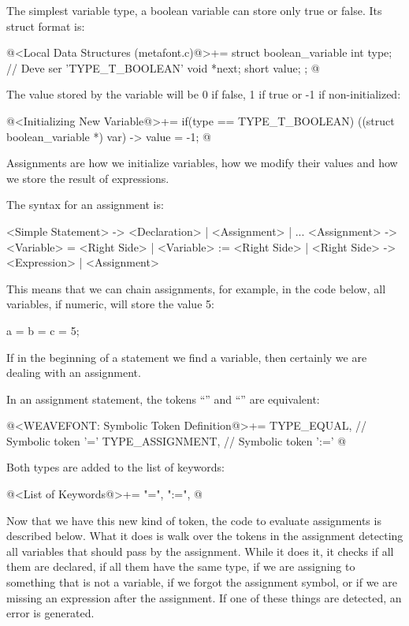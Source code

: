 
The simplest variable type, a boolean variable can store only true or
false. Its struct format is:

\iniciocodigo
@<Local Data Structures (metafont.c)@>+=
struct boolean_variable{
  int type; // Deve ser 'TYPE_T_BOOLEAN'
  void *next;
  short value;
};
@
\fimcodigo

The value stored by the variable will be 0 if false, 1 if true or -1
if non-initialized:

\iniciocodigo
@<Initializing New Variable@>+=
if(type == TYPE_T_BOOLEAN)
  ((struct boolean_variable *) var) -> value = -1;
@
\fimcodigo



Assignments are how we initialize variables, how we modify their
values and how we store the result of expressions.

The syntax for an assignment is:

\alinhaverbatim
<Simple Statement> -> <Declaration> | <Assignment> | ...
<Assignment> -> <Variable> = <Right Side> |
                <Variable> := <Right Side> |
<Right Side> -> <Expression> | <Assignment>
\alinhanormal

This means that we can chain assignments, for example, in the code
below, all variables, if numeric, will store the value 5:

\alinhaverbatim
a = b = c = 5;
\alinhanormal

If in the beginning of a statement we find a variable, then certainly
we are dealing with an assignment.

In an assignment statement, the tokens ``\monoespaco{=}'' and
``\monoespaco{:=}'' are equivalent:

\iniciocodigo
@<WEAVEFONT: Symbolic Token Definition@>+=
TYPE_EQUAL,            // Symbolic token '='
TYPE_ASSIGNMENT,       // Symbolic token ':='
@
\fimcodigo

Both types are added to the list of keywords:

\iniciocodigo
@<List of Keywords@>+=
"=", ":=",
@
\fimcodigo

Now that we have this new kind of token, the code to evaluate
assignments is described below. What it does is walk over the tokens
in the assignment detecting all variables that should pass by the
assignment. While it does it, it checks if all them are declared, if
all them have the same type, if we are assigning to something that is
not a variable, if we forgot the assignment symbol, or if we are
missing an expression after the assignment. If one of these things are
detected, an error is generated.

